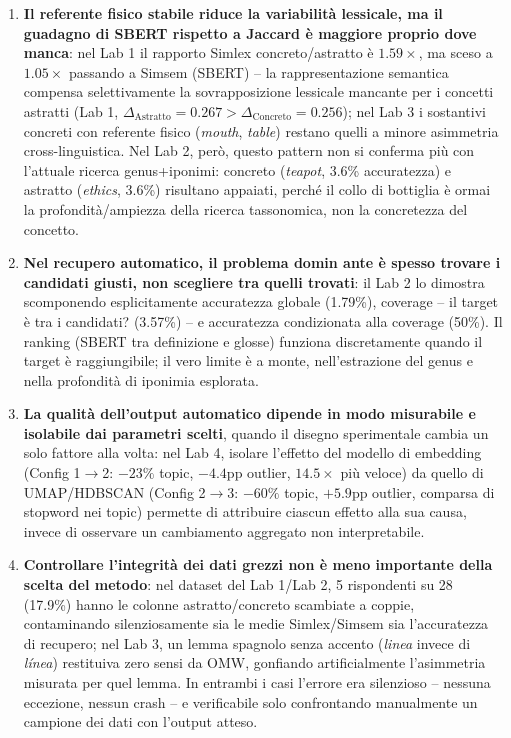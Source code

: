 \documentclass[12pt,a4paper]{article}
\begin{document}
\begin{enumerate}
  \item \textbf{Il referente fisico stabile riduce la variabilit\`a lessicale, ma il guadagno di SBERT rispetto a Jaccard \`e maggiore proprio dove manca}: nel Lab 1 il rapporto Simlex concreto/astratto \`e $1.59\times$, ma sceso a $1.05\times$ passando a Simsem (SBERT) -- la rappresentazione semantica compensa selettivamente la sovrapposizione lessicale mancante per i concetti astratti (Lab 1, $\Delta_{\text{Astratto}}=0.267 > \Delta_{\text{Concreto}}=0.256$); nel Lab 3 i sostantivi concreti con referente fisico (\textit{mouth}, \textit{table}) restano quelli a minore asimmetria cross-linguistica. Nel Lab 2, per\`o, questo pattern non si conferma pi\`u con l'attuale ricerca genus+iponimi: concreto (\textit{teapot}, 3.6\% accuratezza) e astratto (\textit{ethics}, 3.6\%) risultano appaiati, perch\'e il collo di bottiglia \`e ormai la profondit\`a/ampiezza della ricerca tassonomica, non la concretezza del concetto.
  \item \textbf{Nel recupero automatico, il problema domin ante \`e spesso trovare i candidati giusti, non scegliere tra quelli trovati}: il Lab 2 lo dimostra scomponendo esplicitamente accuratezza globale (1.79\%), coverage -- il target \`e tra i candidati? (3.57\%) -- e accuratezza condizionata alla coverage (50\%). Il ranking (SBERT tra definizione e glosse) funziona discretamente quando il target \`e raggiungibile; il vero limite \`e a monte, nell'estrazione del genus e nella profondit\`a di iponimia esplorata.
  \item \textbf{La qualit\`a dell'output automatico dipende in modo misurabile e isolabile dai parametri scelti}, quando il disegno sperimentale cambia un solo fattore alla volta: nel Lab 4, isolare l'effetto del modello di embedding (Config 1$\to$2: $-23\%$ topic, $-4.4$pp outlier, $14.5\times$ pi\`u veloce) da quello di UMAP/HDBSCAN (Config 2$\to$3: $-60\%$ topic, $+5.9$pp outlier, comparsa di stopword nei topic) permette di attribuire ciascun effetto alla sua causa, invece di osservare un cambiamento aggregato non interpretabile.
  \item \textbf{Controllare l'integrit\`a dei dati grezzi non \`e meno importante della scelta del metodo}: nel dataset del Lab 1/Lab 2, 5 rispondenti su 28 (17.9\%) hanno le colonne astratto/concreto scambiate a coppie, contaminando silenziosamente sia le medie Simlex/Simsem sia l'accuratezza di recupero; nel Lab 3, un lemma spagnolo senza accento (\textit{linea} invece di \textit{l\'inea}) restituiva zero sensi da OMW, gonfiando artificialmente l'asimmetria misurata per quel lemma. In entrambi i casi l'errore era silenzioso -- nessuna eccezione, nessun crash -- e verificabile solo confrontando manualmente un campione dei dati con l'output atteso.
\end{enumerate}
\end{document}
